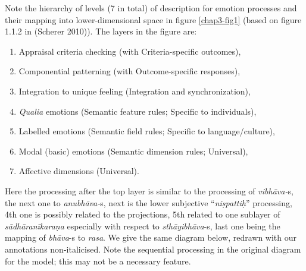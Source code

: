 Note the hierarchy of levels (7 in total) of description for emotion processes and their mapping into lower-dimensional space in figure \ref{chap3-fig1} (based on figure 1.1.2 in (Scherer 2010)). The layers in the figure are: 
\begin{enumerate}
\item Appraisal criteria checking (with Criteria-specific outcomes), 

\item Componential patterning (with Outcome-specific responses), 

\item Integration to unique feeling (Integration and synchronization), 

\item \textsl{Qualia} emotions (Semantic feature rules; Specific to individuals), 

\item Labelled emotions (Semantic field rules; Specific to language/culture), 

\item Modal (basic) emotions (Semantic dimension rules; Universal), 

\item Affective dimensions (Universal). 
\end{enumerate}
Here the processing after the top layer is similar to the processing of \textsl{vibhāva-}s, the next one to \textsl{anubhāva-}s, next is the lower subjective “\textsl{niṣpattiḥ}” processing, 4th one is possibly related to the projections, 5th related to one sublayer of \textsl{sādhāranīkaraṇa} especially with respect to \textsl{sthāyibhāva}-s, last one being the mapping of \textsl{bhāva}-s to \textsl{rasa}. We give the same diagram below, redrawn with our annotations non-italicised. Note the sequential processing in the original diagram for the model; this may not be a necessary feature. 

